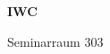 \documentclass[a4paper]{article}
\begin{document}
\printGenericVSLHeader
\begin{center}
\begin{vsltext}{3cm}{4cm}

   \vspace{0.5cm} 

    \textbf{IWC} 

    \vspace{1.5cm}

    Seminarraum 303

\end{vsltext}

\end{center}
\end{document}
